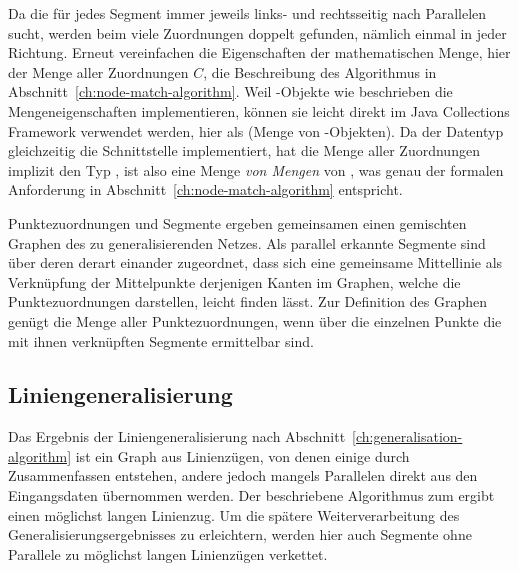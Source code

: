 \documentclass[../main/thesis.tex]{subfiles}
\begin{document}
Da die  für jedes Segment immer jeweils links- und rechtsseitig nach Parallelen sucht, werden beim  viele Zuordnungen doppelt gefunden, nämlich einmal in jeder Richtung.
Erneut vereinfachen die Eigenschaften der mathematischen Menge, hier der Menge aller Zuordnungen $C$, die Beschreibung des Algorithmus in Abschnitt~\ref{ch:node-match-algorithm}.
Weil -Objekte wie beschrieben die Mengeneigenschaften implementieren, können sie leicht direkt im Java Collections Framework verwendet werden, hier als  (Menge von -Objekten).
Da der Datentyp  gleichzeitig die Schnittstelle  implementiert, hat die Menge aller Zuordnungen implizit den Typ , ist also eine Menge \emph{von Mengen} von , was genau der formalen Anforderung in Abschnitt~\ref{ch:node-match-algorithm} entspricht.


Punktezuordnungen und Segmente ergeben gemeinsamen einen gemischten Graphen des zu generalisierenden Netzes.
Als parallel erkannte Segmente sind über deren  derart einander zugeordnet, dass sich eine gemeinsame Mittellinie als Verknüpfung der Mittelpunkte derjenigen Kanten im Graphen, welche die Punktezuordnungen darstellen, leicht finden lässt.
Zur Definition des Graphen genügt die Menge aller Punktezuordnungen, wenn über die einzelnen Punkte die mit ihnen verknüpften Segmente ermittelbar sind.




\subsection{Liniengeneralisierung}

Das Ergebnis der Liniengeneralisierung nach Abschnitt~\ref{ch:generalisation-algorithm} ist ein Graph aus Linienzügen, von denen einige durch Zusammenfassen entstehen, andere jedoch mangels Parallelen direkt aus den Eingangsdaten übernommen werden.
Der beschriebene Algorithmus zum  ergibt einen möglichst langen Linienzug.
Um die spätere Weiterverarbeitung des Generalisierungsergebnisses zu erleichtern, werden hier auch Segmente ohne Parallele zu möglichst langen Linienzügen verkettet.
\end{document}
